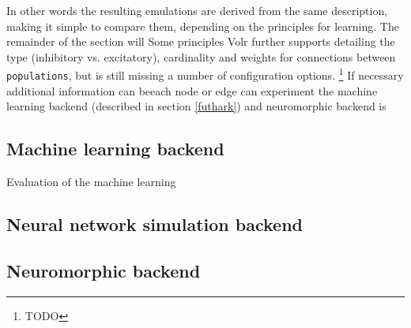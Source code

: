 \documentclass[report.tex]{subfiles}
\begin{document}
In other words the resulting emulations are derived from the same description, making it simple to compare them, depending on the principles for learning.
The remainder of the section will
Some principles
Volr further supports detailing the type (inhibitory vs. excitatory), cardinality and weights for connections between \texttt{populations}, but is still missing a number of configuration options.
\footnote{TODO}
If necessary additional information can beeach node or edge can
 experiment the machine learning backend (described in section \ref{futhark}) and neuromorphic backend is

\subsection{Machine learning backend} \label{sec:futhark}
Evaluation of the machine learning

\subsection{Neural network simulation backend}

\subsection{Neuromorphic backend} \label{sec:neuromorphic}
\end{document}
